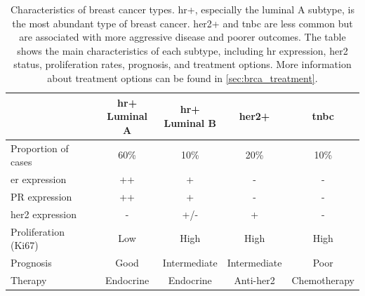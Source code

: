 \begin{table}[ht]
    \centering
    \begin{tabular}{|l|c|c|c|c|}
        \hline
                                        & \makecell{\gls{hr+}
        \\Luminal A} &
        \makecell{\gls{hr+}                                                  \\
        Luminal B}
                                        &
        \gls{her2+}
                                        & \gls{tnbc}
        \\ \hline
        Proportion of cases             & 60\%                & 10\%
                                        &
        20\%
                                        & 10\%
        \\
        \gls{er}\textalpha{} expression & ++                  & +
                                        & -
                                        & -
        \\
        PR expression                   & ++                  & +
                                        & -
                                        & -
        \\
        \gls{her2} expression           & -                   & +/-
                                        & +
                                        & -
        \\
        Proliferation (Ki67)            & Low                 & High
                                        &
        High
                                        & High
        \\
        Prognosis                       & Good                & Intermediate
                                        &
        Intermediate
                                        & Poor
        \\
        Therapy                         & Endocrine           & Endocrine

                                        &
        Anti-\gls{her2}
                                        & Chemotherapy
        \\ \hline
    \end{tabular}
    \caption{Characteristics of breast cancer
        types\supercite{clusan_basic_2023}.
        \Gls{hr+}, especially the luminal A subtype, is the most
        abundant type of breast cancer.
        \Gls{her2+} and \gls{tnbc} are less common
        but are associated with more aggressive disease and poorer outcomes.
        The table shows the main characteristics of each subtype, including \gls{hr}
        expression, \gls{her2} status, proliferation rates, prognosis, and treatment
        options.
        More information about treatment options can be found in
        \cref{sec:brca_treatment}.
    }
    \label{tab:brca_subtypes}
\end{table}

